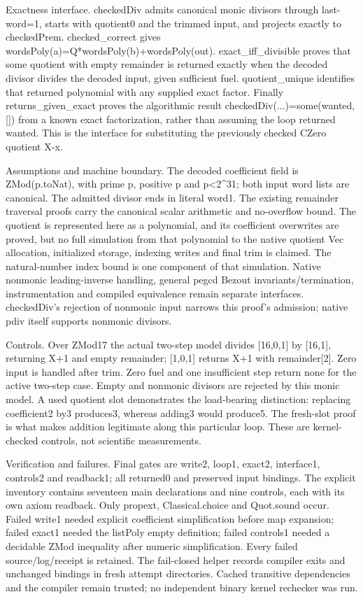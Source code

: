 \documentclass[10pt]{article}
\begin{document}
Exactness interface. checkedDiv admits canonical monic divisors through last-word=1, starts with quotient0 and the trimmed input, and projects exactly to checkedPrem. checked\_correct gives wordsPoly(a)=Q*wordsPoly(b)+wordsPoly(out). exact\_iff\_divisible proves that some quotient with empty remainder is returned exactly when the decoded divisor divides the decoded input, given sufficient fuel. quotient\_unique identifies that returned polynomial with any supplied exact factor. Finally returns\_given\_exact proves the algorithmic result checkedDiv(...)=some(wanted,[]) from a known exact factorization, rather than assuming the loop returned wanted. This is the interface for substituting the previously checked CZero quotient X-x.\par\medskip
Assumptions and machine boundary. The decoded coefficient field is ZMod(p.toNat), with prime p, positive p and p<2\textasciicircum{}31; both input word lists are canonical. The admitted divisor ends in literal word1. The existing remainder traversal proofs carry the canonical scalar arithmetic and no-overflow bound. The quotient is represented here as a polynomial, and its coefficient overwrites are proved, but no full simulation from that polynomial to the native quotient Vec allocation, initialized storage, indexing writes and final trim is claimed. The natural-number index bound is one component of that simulation. Native nonmonic leading-inverse handling, general pegcd Bezout invariants/termination, instrumentation and compiled equivalence remain separate interfaces. checkedDiv's rejection of nonmonic input narrows this proof's admission; native pdiv itself supports nonmonic divisors.\par\medskip
Controls. Over ZMod17 the actual two-step model divides [16,0,1] by [16,1], returning X+1 and empty remainder; [1,0,1] returns X+1 with remainder[2]. Zero input is handled after trim. Zero fuel and one insufficient step return none for the active two-step case. Empty and nonmonic divisors are rejected by this monic model. A used quotient slot demonstrates the load-bearing distinction: replacing coefficient2 by3 produces3, whereas adding3 would produce5. The fresh-slot proof is what makes addition legitimate along this particular loop. These are kernel-checked controls, not scientific measurements.\par\medskip
Verification and failures. Final gates are write2, loop1, exact2, interface1, controls2 and readback1; all returned0 and preserved input bindings. The explicit inventory contains seventeen main declarations and nine controls, each with its own axiom readback. Only propext, Classical.choice and Quot.sound occur. Failed write1 needed explicit coefficient simplification before map expansion; failed exact1 needed the listPoly empty definition; failed controls1 needed a decidable ZMod inequality after numeric simplification. Every failed source/log/receipt is retained. The fail-closed helper records compiler exits and unchanged bindings in fresh attempt directories. Cached transitive dependencies and the compiler remain trusted; no independent binary kernel rechecker was run.\par\medskip
\end{document}
